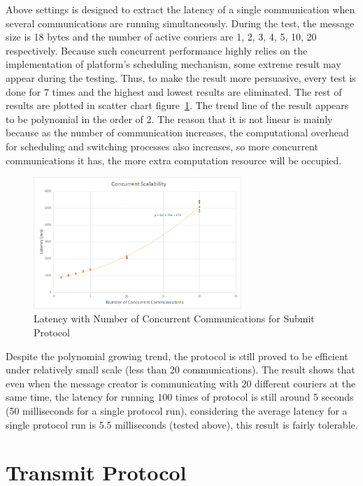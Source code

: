 Above settings is designed to extract the latency of a single communication when several communications are running simultaneously. During the test, the message size is 18 bytes and the number of active couriers are 1, 2, 3, 4, 5, 10, 20 respectively. Because such concurrent performance highly relies on the implementation of platform's scheduling mechanism, some extreme result may appear during the testing. Thus, to make the result more persuasive, every test is done for 7 times and the highest and lowest results are eliminated. The rest of results are plotted in scatter chart figure~\ref{fig:concurrentsubmit}. The trend line of the result appears to be polynomial in the order of 2. The reason that it is not linear is mainly because as the number of communication increases, the computational overhead for scheduling and switching processes also increases, so more concurrent communications it has, the more extra computation resource will be occupied.

\begin{figure}[h!]
\centering
\includegraphics[width=0.7\textwidth,natwidth=815,natheight=518]{figures/concurrentsubmit.png}
\caption{Latency with Number of Concurrent Communications for Submit Protocol}
\label{fig:concurrentsubmit}
\end{figure}

Despite the polynomial growing trend, the protocol is still proved to be efficient under relatively small scale (less than 20 communications). The result shows that even when the message creator is communicating with 20 different couriers at the same time, the latency for running 100 times of protocol is still around 5 seconds (50 milliseconds for a single protocol run), considering the average latency for a single protocol run is 5.5 milliseconds (tested above), this result is fairly tolerable.

\pagebreak
\section{Transmit Protocol}
